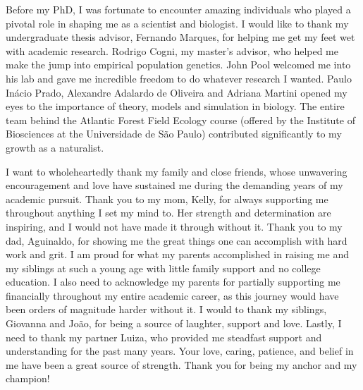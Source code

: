 {Before my PhD, I was fortunate to encounter amazing individuals who played a pivotal role in shaping me as a scientist and biologist.
I would like to thank my undergraduate thesis advisor, Fernando Marques, for helping me get my feet wet with academic research.
Rodrigo Cogni, my master's advisor, who helped me make the jump into empirical population genetics.
John Pool welcomed me into his lab and gave me incredible freedom to do whatever research I wanted.
Paulo Inácio Prado, Alexandre Adalardo de Oliveira and Adriana Martini opened my eyes to the importance of theory, models and simulation in biology.
The entire team behind the Atlantic Forest Field Ecology course (offered by the Institute of Biosciences at the Universidade de São Paulo) contributed significantly to my growth as a naturalist.

I want to wholeheartedly thank my family and close friends,
whose unwavering encouragement and love have sustained me during the demanding years of my academic pursuit.
Thank you to my mom, Kelly, for always supporting me throughout anything I set my mind to.
Her strength and determination are inspiring, and I would not have made it through without it.
Thank you to my dad, Aguinaldo, for showing me the great things one can accomplish with hard work and grit.
I am proud for what my parents accomplished in raising me and my siblings
at such a young age with little family support and no college education.
I also need to acknowledge my parents for partially supporting me financially throughout my entire academic career,
as this journey would have been orders of magnitude harder without it.
I would to thank my siblings, Giovanna and João, for being a source of laughter, support and love.
Lastly, I need to thank my partner Luiza, who provided me steadfast support and understanding for the past many years.
Your love, caring, patience, and belief in me have been a great source of strength.
Thank you for being my anchor and my champion!

}

